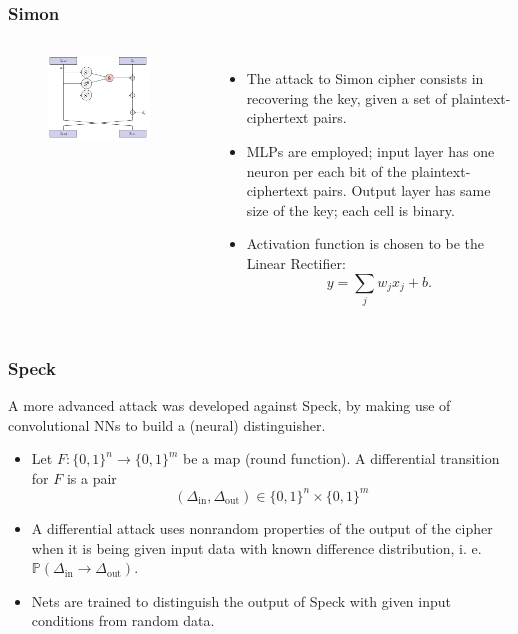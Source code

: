 \documentclass{beamer}
\begin{document}
\begin{frame}
\frametitle{Simon}
\begin{columns}[c]
\begin{figure}
\includegraphics[width = 0.9\textwidth]{"pictures/simon.png"}
\end{figure}
\begin{itemize}
\item The attack to Simon cipher consists in recovering the key, given a set of plaintext-ciphertext pairs.
\item MLPs are employed; input layer has one neuron per each bit of the plaintext-ciphertext pairs. Output layer has same size of the key; each cell is binary.
\item Activation function is chosen to be the Linear Rectifier:
	\begin{equation*}
	y = \sum_{j}w_j x_j + b.
	\end{equation*}
\end{itemize}
\end{columns}
\end{frame}

\begin{frame}
\frametitle{Speck}
A more advanced attack was developed against Speck, by making use of convolutional NNs to build a (neural) distinguisher. 
\begin{itemize}
\item Let $F: \{0,1\}^n \longrightarrow \{0,1\}^m$ be a map (round function). A differential transition for $F$ is a pair
$$\left(\Delta_{\text{in}},\Delta_{\text{out}} \right) \in \{0,1\}^n \times \{0,1\}^m$$
\item A differential attack uses nonrandom properties of the output of the cipher when it is being given input data with known difference distribution, i. e. $\mathbb{P}\left( \Delta_{\text{in}} \rightarrow \Delta_{\text{out}}\right)$.
\item Nets are trained to distinguish the output of Speck with given input conditions from random data.
\end{itemize} 
\end{frame}
\end{document}
